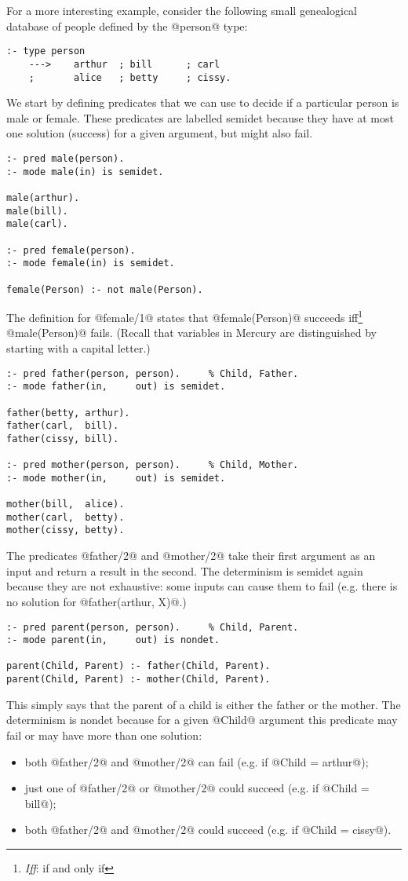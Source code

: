 \documentclass[a4paper,11pt,notitlepage,onecolumn]{article}
\begin{document}
For a more interesting example, consider the following small
genealogical database of people defined by the @person@ type:
\begin{verbatim}
:- type person
    --->    arthur  ; bill      ; carl
    ;       alice   ; betty     ; cissy.
\end{verbatim}
We start by defining predicates that we can use to decide if a
particular person is male or female.  These predicates are
labelled semidet because they have at most one solution
(success) for a given argument, but might also fail.
\begin{verbatim}
:- pred male(person).
:- mode male(in) is semidet.

male(arthur).
male(bill).
male(carl).

:- pred female(person).
:- mode female(in) is semidet.

female(Person) :- not male(Person).
\end{verbatim}
The definition for @female/1@ states that @female(Person)@ succeeds
iff\footnote{\emph{Iff}: if and only if} @male(Person)@ fails.  (Recall
that variables in Mercury are distinguished by starting with a capital
letter.)
\begin{verbatim}
:- pred father(person, person).     % Child, Father.
:- mode father(in,     out) is semidet.

father(betty, arthur).
father(carl,  bill).
father(cissy, bill).

:- pred mother(person, person).     % Child, Mother.
:- mode mother(in,     out) is semidet.

mother(bill,  alice).
mother(carl,  betty).
mother(cissy, betty).
\end{verbatim}
The predicates @father/2@ and @mother/2@ take their first argument
as an input and return a result in the second.  The
determinism is semidet again because they are not exhaustive:
some inputs can cause them to fail (e.g. there is no solution
for @father(arthur, X)@.)
\begin{verbatim}
:- pred parent(person, person).     % Child, Parent.
:- mode parent(in,     out) is nondet.

parent(Child, Parent) :- father(Child, Parent).
parent(Child, Parent) :- mother(Child, Parent).
\end{verbatim}
This simply says that the parent of a child is either the
father or the mother.  The determinism is nondet because for a
given @Child@ argument this predicate may fail or may have more
than one solution:
\begin{itemize}
\item both @father/2@ and @mother/2@ can fail
(e.g. if @Child = arthur@);
\item just one of @father/2@ or @mother/2@ could succeed
(e.g. if @Child = bill@);
\item both @father/2@ and @mother/2@ could succeed
(e.g. if @Child = cissy@).
\end{itemize}
\end{document}
